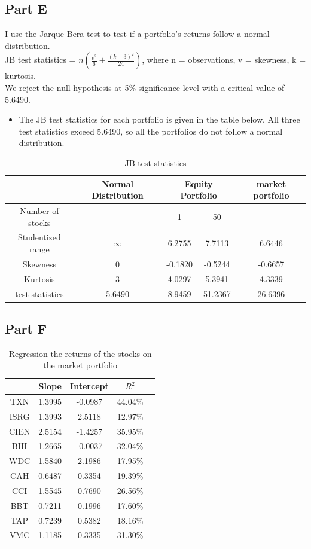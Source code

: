 \documentclass{report}
\begin{document}
\subsection{Part E}
I use the Jarque-Bera test to test if a portfolio's returns follow a normal distribution. \\
JB test statistics = $n(\frac{v^2}{6}+\frac{(k-3)^2}{24})$, where n = observations, v = skewness, k = kurtosis.\\
We reject the null hypothesis at 5\% significance level with a critical value of 5.6490. \\
\begin{itemize}
\item The JB test statistics for each portfolio is given in the table below. All three test statistics exceed 5.6490, so all the portfolios do not follow a normal distribution.
\end{itemize}
\begin{table}[H]
	\centering
	\caption{JB test statistics}
	\begin{tabular}{cccccl}\hline\hline
 &Normal Distribution & \multicolumn{2}{c}{Equity Portfolio} & \multicolumn{2}{c}{market portfolio} \\\hline
Number of stocks & &1 & 50 & \multicolumn{2}{c}{} \\\hline
Studentized range &$\infty$& 6.2755 & 7.7113 & \multicolumn{2}{c}{6.6446}\\
Skewness &0& -0.1820 & -0.5244 & \multicolumn{2}{c}{-0.6657}\\
Kurtosis &3& 4.0297 & 5.3941 & \multicolumn{2}{c}{4.3339}\\
test statistics &5.6490& 8.9459 & 51.2367 & \multicolumn{2}{c}{26.6396}\\\hline
\end{tabular}
\end{table}

\subsection{Part F}
\begin{table}[H]
	\centering
	\caption{Regression the returns of the stocks on the market portfolio}
	\begin{tabular}{ccccl}\hline\hline
 	& Slope & Intercept & $R^2$ \\\hline
	TXN & 1.3995 & -0.0987 & 44.04\% \\
	ISRG & 1.3993 & 2.5118 & 12.97\% \\
	CIEN & 2.5154 & -1.4257 & 35.95\% \\
	BHI & 1.2665 & -0.0037 & 32.04\% \\
	WDC & 1.5840 & 2.1986 & 17.95\% \\
	CAH & 0.6487 & 0.3354 & 19.39\% \\
	CCI & 1.5545 & 0.7690 & 26.56\% \\
	BBT & 0.7211 & 0.1996 & 17.60\% \\
	TAP & 0.7239 & 0.5382 & 18.16\% \\
	VMC & 1.1185 & 0.3335 &31.30\% \\\hline
\end{tabular}
\end{table}	
\end{document}
